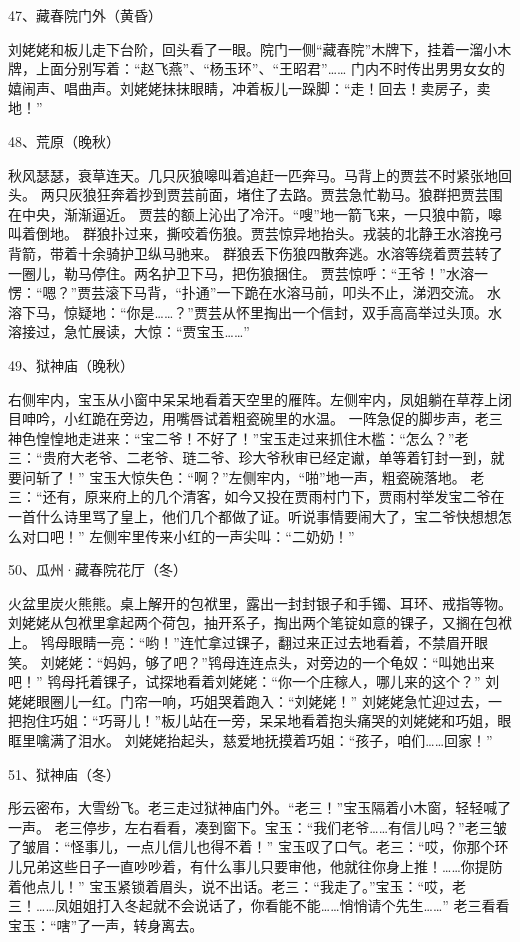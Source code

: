 47、藏春院门外（黄昏）\par
刘姥姥和板儿走下台阶，回头看了一眼。院门一侧“藏春院”木牌下，挂着一溜小木牌，上面分别写着：“赵飞燕”、“杨玉环”、“王昭君”……
门内不时传出男男女女的嬉闹声、唱曲声。刘姥姥抹抹眼睛，冲着板儿一跺脚：“走！回去！卖房子，卖地！”

48、荒原（晚秋）\par
秋风瑟瑟，衰草连天。几只灰狼嗥叫着追赶一匹奔马。马背上的贾芸不时紧张地回头。
两只灰狼狂奔着抄到贾芸前面，堵住了去路。贾芸急忙勒马。狼群把贾芸围在中央，渐渐逼近。
贾芸的额上沁出了冷汗。“嗖”地一箭飞来，一只狼中箭，嗥叫着倒地。
群狼扑过来，撕咬着伤狼。贾芸惊异地抬头。戎装的北静王水溶挽弓背箭，带着十余骑护卫纵马驰来。
群狼丢下伤狼四散奔逃。水溶等绕着贾芸转了一圈儿，勒马停住。两名护卫下马，把伤狼捆住。
贾芸惊呼：“王爷！”水溶一愣：“嗯？”贾芸滚下马背，“扑通”一下跪在水溶马前，叩头不止，涕泗交流。
水溶下马，惊疑地：“你是……？”贾芸从怀里掏出一个信封，双手高高举过头顶。水溶接过，急忙展读，大惊：“贾宝玉……”

49、狱神庙（晚秋）\par
右侧牢内，宝玉从小窗中呆呆地看着天空里的雁阵。左侧牢内，凤姐躺在草荐上闭目呻吟，小红跪在旁边，用嘴唇试着粗瓷碗里的水温。
一阵急促的脚步声，老三神色惶惶地走进来：“宝二爷！不好了！”宝玉走过来抓住木槛：“怎么？”老三：“贵府大老爷、二老爷、琏二爷、珍大爷秋审已经定谳，单等着钉封一到，就要问斩了！”
宝玉大惊失色：“啊？”左侧牢内，“啪”地一声，粗瓷碗落地。
老三：“还有，原来府上的几个清客，如今又投在贾雨村门下，贾雨村举发宝二爷在一首什么诗里骂了皇上，他们几个都做了证。听说事情要闹大了，宝二爷快想想怎么对口吧！”
左侧牢里传来小红的一声尖叫：“二奶奶！”

50、瓜州·藏春院花厅（冬）\par
火盆里炭火熊熊。桌上解开的包袱里，露出一封封银子和手镯、耳环、戒指等物。
刘姥姥从包袱里拿起两个荷包，抽开系子，掏出两个笔锭如意的锞子，又搁在包袱上。
鸨母眼睛一亮：“哟！”连忙拿过锞子，翻过来正过去地看着，不禁眉开眼笑。
刘姥姥：“妈妈，够了吧？”鸨母连连点头，对旁边的一个龟奴：“叫她出来吧！”
鸨母托着锞子，试探地看着刘姥姥：“你一个庄稼人，哪儿来的这个？”
刘姥姥眼圈儿一红。门帘一响，巧姐哭着跑入：“刘姥姥！”
刘姥姥急忙迎过去，一把抱住巧姐：“巧哥儿！”板儿站在一旁，呆呆地看着抱头痛哭的刘姥姥和巧姐，眼眶里噙满了泪水。
刘姥姥抬起头，慈爱地抚摸着巧姐：“孩子，咱们……回家！”

51、狱神庙（冬）\par
彤云密布，大雪纷飞。老三走过狱神庙门外。“老三！”宝玉隔着小木窗，轻轻喊了一声。
老三停步，左右看看，凑到窗下。宝玉：“我们老爷……有信儿吗？”老三皱了皱眉：“怪事儿，一点儿信儿也得不着！”
宝玉叹了口气。老三：“哎，你那个环儿兄弟这些日子一直吵吵着，有什么事儿只要审他，他就往你身上推！……你提防着他点儿！”
宝玉紧锁着眉头，说不出话。老三：“我走了。”宝玉：“哎，老三！……凤姐姐打入冬起就不会说话了，你看能不能……悄悄请个先生……”
老三看看宝玉：“嗐”了一声，转身离去。

